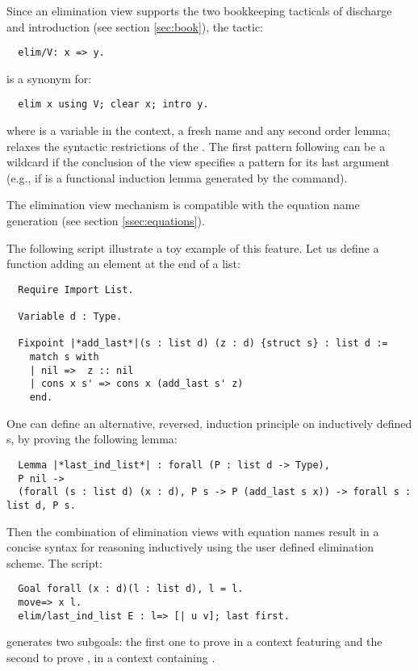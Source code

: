 Since an elimination view supports the two bookkeeping tacticals of
discharge and introduction (see section \ref{sec:book}), the \ssr{} tactic:
\begin{lstlisting}
  elim/V: x => y.
\end{lstlisting}
is a synonym for:
\begin{lstlisting}
  elim x using V; clear x; intro y.
\end{lstlisting}
where  is a variable in the context,  a fresh name and 
any second order lemma; \ssr{} relaxes the syntactic restrictions of
the \Coq{} . The first pattern following \ssrC{:} can be a \ssrC{_}
wildcard if the conclusion of the view  specifies a pattern for
its last argument (e.g., if  is a functional induction lemma
generated by the  command).

The elimination view mechanism is compatible with the equation name
generation (see section \ref{ssec:equations}).

The following script illustrate a toy example of this feature. Let us
define a function adding an element at the end of a list:
\begin{lstlisting}
  Require Import List.

  Variable d : Type.

  Fixpoint |*add_last*|(s : list d) (z : d) {struct s} : list d :=
    match s with
    | nil =>  z :: nil
    | cons x s' => cons x (add_last s' z)
    end.
\end{lstlisting}

One can define an alternative, reversed, induction principle on inductively
defined s, by proving the following lemma:

\begin{lstlisting}
  Lemma |*last_ind_list*| : forall (P : list d -> Type),
  P nil ->
  (forall (s : list d) (x : d), P s -> P (add_last s x)) -> forall s : list d, P s.
\end{lstlisting}

Then the combination of elimination views with equation names result
in a concise syntax for reasoning inductively using the user
defined elimination scheme. The script:
\begin{lstlisting}
  Goal forall (x : d)(l : list d), l = l.
  move=> x l.
  elim/last_ind_list E : l=> [| u v]; last first.
\end{lstlisting}
generates two subgoals: the first one to prove  in a
context featuring  and the second to prove
, in a context containing
.

